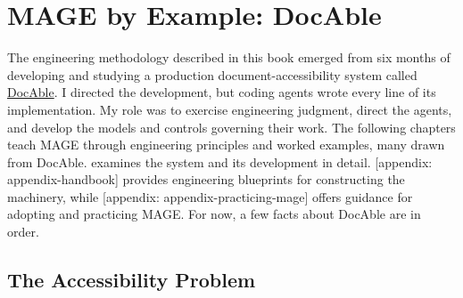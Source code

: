 


\chapter{MAGE by Example: DocAble}


The engineering methodology described in this book emerged from six months of developing and studying a production document-accessibility system called \href{\%7B\%7Bproduct_url\%7D\%7D}{DocAble}. I directed the development, but coding agents wrote every line of its implementation. My role was to exercise engineering judgment, direct the agents, and develop the models and controls governing their work. The following chapters teach MAGE through engineering principles and worked examples, many drawn from DocAble.  examines the system and its development in detail. {[}appendix: appendix-handbook{]} provides engineering blueprints for constructing the machinery, while {[}appendix: appendix-practicing-mage{]} offers guidance for adopting and practicing MAGE. For now, a few facts about DocAble are in order.

\section{The Accessibility Problem}\label{heading:the-accessibility-problem}



